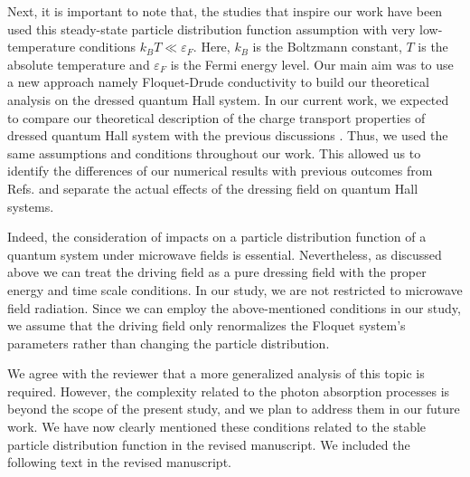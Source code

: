 \documentclass{article}
\begin{document}
Next, it is important to note that, the studies \cite{wackerl20,wackerlthesis20,dini16,endo09} that inspire our work have been used this steady-state particle distribution function assumption with very low-temperature conditions $k_B T \ll \varepsilon_F$. Here, $k_B$ is the Boltzmann constant, $T$ is the absolute temperature and $\varepsilon_F$ is the Fermi energy level.
Our main aim was to use a new approach namely Floquet-Drude conductivity \cite{wackerl20} to build our theoretical analysis on the dressed quantum Hall system.
In our current work, we expected to compare our theoretical description of the charge transport properties of dressed quantum Hall system with the previous discussions \cite{dini16,endo09}. Thus, we used the same assumptions and conditions throughout our work.
This allowed us to identify the differences of our numerical results with previous outcomes from Refs. \cite{dini16,endo09} and separate the actual effects of the dressing field on quantum Hall systems.

Indeed, the consideration of impacts on a particle distribution function of a quantum system under microwave fields is essential. Nevertheless, as discussed above we can treat the driving field as a pure dressing field with the proper energy and time scale conditions. In our study, we are not restricted to microwave field radiation. Since we can employ the above-mentioned conditions in our study, we assume that the driving field only renormalizes the Floquet system's parameters rather than changing the particle distribution.

We agree with the reviewer that a more generalized analysis of this topic is required. However, the complexity related to the photon absorption processes is beyond the scope of the present study, and we plan to address them in our future work. We have now clearly mentioned these conditions related to the stable particle distribution function in the revised manuscript. We included the following text in the revised manuscript.
\end{document}
